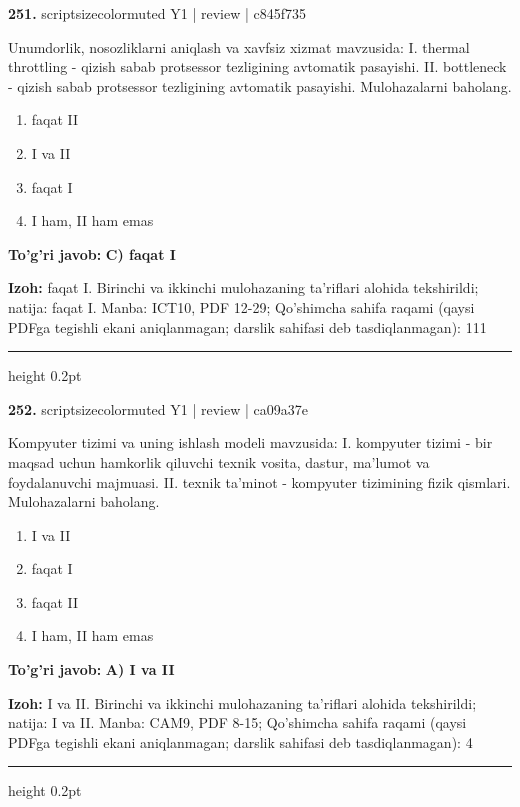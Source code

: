 \documentclass[10pt,a4paper]{article}
\begin{document}
{\bfseries\sffamily\color{ink} 251.} {scriptsizecolor{muted} Y1 | review | c845f735}
\par
Unumdorlik, nosozliklarni aniqlash va xavfsiz xizmat mavzusida: I. thermal throttling - qizish sabab protsessor tezligining avtomatik pasayishi. II. bottleneck - qizish sabab protsessor tezligining avtomatik pasayishi. Mulohazalarni baholang.
\begin{enumerate}[label=\Alph*),leftmargin=9mm]
\item faqat II
\item I va II
\item faqat I
\item I ham, II ham emas
\end{enumerate}
\begin{tcolorbox}[enhanced,breakable,colback=teal!4,colframe=teal!60!black,boxrule=0.45pt,arc=1.2mm,left=2.7mm,right=2.7mm,top=1.8mm,bottom=1.8mm,before skip=2mm,after skip=2mm]
{\bfseries\sffamily\color{teal}To'g'ri javob:} \textbf{C) faqat I}
\par\smallskip
{\bfseries Izoh:} faqat I. Birinchi va ikkinchi mulohazaning ta'riflari alohida tekshirildi; natija: faqat I. Manba: ICT10, PDF 12-29; Qo'shimcha sahifa raqami (qaysi PDFga tegishli ekani aniqlanmagan; darslik sahifasi deb tasdiqlanmagan): 111
\end{tcolorbox}
\vspace{2mm}\hrule height 0.2pt\vspace{3mm}

{\bfseries\sffamily\color{ink} 252.} {scriptsizecolor{muted} Y1 | review | ca09a37e}
\par
Kompyuter tizimi va uning ishlash modeli mavzusida: I. kompyuter tizimi - bir maqsad uchun hamkorlik qiluvchi texnik vosita, dastur, ma'lumot va foydalanuvchi majmuasi. II. texnik ta'minot - kompyuter tizimining fizik qismlari. Mulohazalarni baholang.
\begin{enumerate}[label=\Alph*),leftmargin=9mm]
\item I va II
\item faqat I
\item faqat II
\item I ham, II ham emas
\end{enumerate}
\begin{tcolorbox}[enhanced,breakable,colback=teal!4,colframe=teal!60!black,boxrule=0.45pt,arc=1.2mm,left=2.7mm,right=2.7mm,top=1.8mm,bottom=1.8mm,before skip=2mm,after skip=2mm]
{\bfseries\sffamily\color{teal}To'g'ri javob:} \textbf{A) I va II}
\par\smallskip
{\bfseries Izoh:} I va II. Birinchi va ikkinchi mulohazaning ta'riflari alohida tekshirildi; natija: I va II. Manba: CAM9, PDF 8-15; Qo'shimcha sahifa raqami (qaysi PDFga tegishli ekani aniqlanmagan; darslik sahifasi deb tasdiqlanmagan): 4
\end{tcolorbox}
\vspace{2mm}\hrule height 0.2pt\vspace{3mm}
\end{document}
